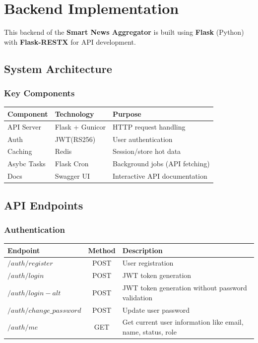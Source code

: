 

\chapter{Backend Implementation}\label{ch:backend-implementation}


This backend of the \textbf{Smart News Aggregator} is built using \textbf{Flask} (Python) with \textbf{Flask-RESTX} for API development.


\section{System Architecture}\label{sec:system-architecture}


\subsection{Key Components}\label{subsec:backend-key-components}

\begin{tabular}{lll}
  \toprule
  Component & Technology & Purpose \\
  \midrule
  API Server & Flask\cite{flask, flaskrestx} + Gunicor & HTTP request handling \\
  Auth & JWT(RS256)\cite{jwt}  & User authentication \\
  Caching & Redis & Session/store hot data \\
  Asybc Tasks & Flask Cron & Background jobs (API fetching) \\
  Docs & Swagger UI\cite{swagger} & Interactive API documentation \\
  \bottomrule
\end{tabular}


\section{API Endpoints}\label{sec:api-endpoints}


\subsection{Authentication}\label{subsec:authentication}

\begin{tabularx}{\textwidth}{lcX}
  \toprule
  Endpoint & Method & Description \\
  \midrule
  $/auth/register$ & POST & User registration \\
  $/auth/login$ & POST  & JWT token generation \\
  $/auth/login-alt$ & POST & JWT token generation without password validation \\
  $/auth/change\_password$ & POST & Update user password \\
  $/auth/me$ & GET & Get current user information like email, name, status, role \\
  \bottomrule
\end{tabularx}

